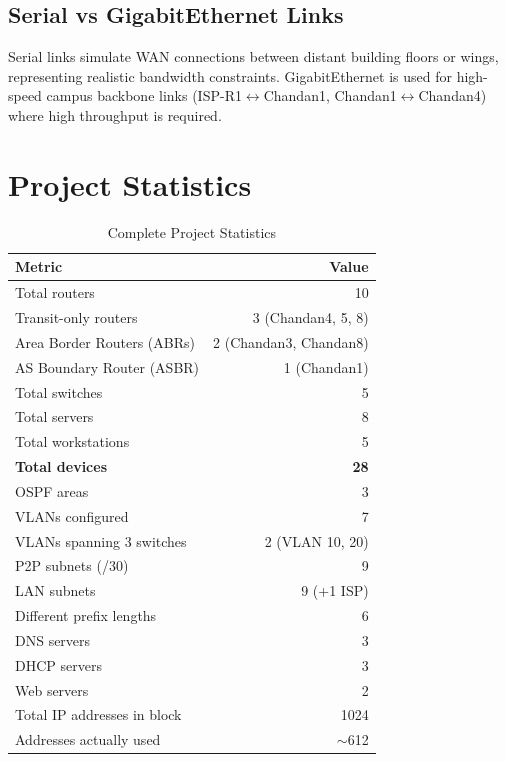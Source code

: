\documentclass[12pt,a4paper]{report}
\begin{document}
\section{Serial vs GigabitEthernet Links}
Serial links simulate WAN connections between distant building floors or wings, representing realistic bandwidth constraints. GigabitEthernet is used for high-speed campus backbone links (ISP-R1$\leftrightarrow$Chandan1, Chandan1$\leftrightarrow$Chandan4) where high throughput is required.

\chapter{Project Statistics}

\begin{table}[H]
\centering
\caption{Complete Project Statistics}
\begin{tabular}{lr}
\toprule
\textbf{Metric} & \textbf{Value} \\
\midrule
Total routers & 10 \\
Transit-only routers & 3 (Chandan4, 5, 8) \\
Area Border Routers (ABRs) & 2 (Chandan3, Chandan8) \\
AS Boundary Router (ASBR) & 1 (Chandan1) \\
Total switches & 5 \\
Total servers & 8 \\
Total workstations & 5 \\
\textbf{Total devices} & \textbf{28} \\
\midrule
OSPF areas & 3 \\
VLANs configured & 7 \\
VLANs spanning 3 switches & 2 (VLAN 10, 20) \\
P2P subnets (/30) & 9 \\
LAN subnets & 9 (+1 ISP) \\
Different prefix lengths & 6 \\
\midrule
DNS servers & 3 \\
DHCP servers & 3 \\
Web servers & 2 \\
\midrule
Total IP addresses in block & 1024 \\
Addresses actually used & $\sim$612 \\
\bottomrule
\end{tabular}
\end{table}
\end{document}
